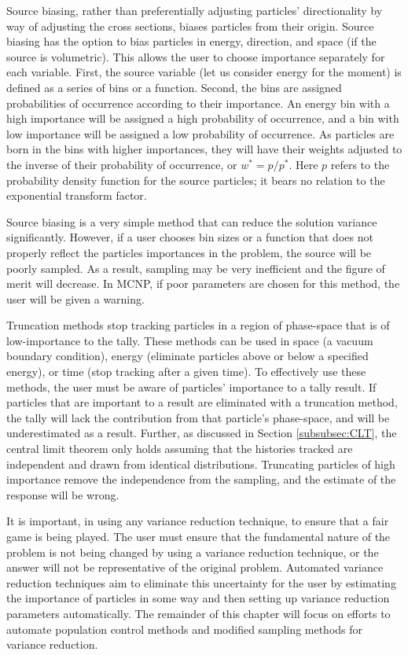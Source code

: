 Source biasing, rather than preferentially adjusting particles' directionality
by way of adjusting the cross sections, biases particles from their origin.
Source biasing has the option to bias particles in energy, direction, and space
(if the source is volumetric). This allows the user to choose importance
separately for each variable. First, the source variable (let us consider
energy for the moment) is defined as a series of bins or a function. Second, the bins are
assigned probabilities of occurrence according to their importance. An energy bin
with a high importance will be assigned a high probability of occurrence, and a
bin with low importance will be assigned a low probability of occurrence. As
particles are born in the bins with higher importances, they will have their
weights adjusted to the inverse of their probability of occurrence, or $w^* =
p/p^*$. Here $p$ refers to the probability density function for the source
particles; it bears no relation to the exponential transform factor.

Source biasing is a very simple method that can reduce the solution variance
significantly. However, if a user chooses bin sizes or a function that does not
properly reflect the particles importances in the problem, the source will be
poorly sampled. As a result, sampling may be very inefficient and the figure of
merit will decrease. In MCNP, if poor parameters are chosen for this method, the
user will be given a warning.

Truncation methods stop tracking particles in a region of phase-space that is of
low-importance to the tally. These methods can be used in space (a vacuum boundary
condition), energy (eliminate particles above or below a specified energy), or
time (stop
tracking after a given time). To effectively use these methods, the user must be
aware of
particles' importance to a tally result. If particles that are important to a
result are
 eliminated with a truncation method, the tally will lack the contribution from
 that particle's phase-space, and will be underestimated as a result. Further,
 as discussed in Section \ref{subsubsec:CLT}, the central limit theorem only
 holds assuming that the histories tracked are independent and drawn from identical distributions.
 Truncating particles of high importance remove the independence from the
 sampling, and the estimate of the response will be wrong.

It is important, in using any variance reduction technique, to ensure that a
fair game
is being played. The user must ensure that the fundamental nature of the problem
is not
being changed by using a variance reduction technique, or the answer will not be
representative of the original problem. Automated variance reduction techniques aim to
eliminate this uncertainty for the user by estimating the importance of
particles in some
 way and then setting up variance reduction parameters automatically.
The remainder of this chapter will focus on efforts to
automate population
control methods and modified sampling methods for variance reduction.

